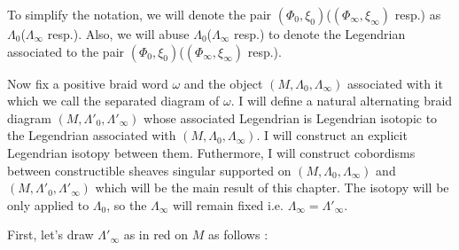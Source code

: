 To simplify the notation, we will denote the pair $(\Phi_0,\xi_0)$($(\Phi_\infty,\xi_\infty)$ resp.) as $\Lambda_0$($\Lambda_\infty$ resp.). Also, we will abuse $\Lambda_0$($\Lambda_\infty$ resp.) to denote the Legendrian associated to the pair $(\Phi_0,\xi_0)$($(\Phi_\infty,\xi_\infty)$ resp.).

Now fix a positive braid word $\omega$ and the object $(M,\Lambda_0,\Lambda_\infty)$ associated with it which we call the separated diagram of $\omega$. I will define a natural alternating braid diagram $(M,\Lambda'_0,\Lambda'_\infty)$ whose associated Legendrian is Legendrian isotopic to the Legendrian associated with $(M,\Lambda_0,\Lambda_\infty)$. I will construct an explicit Legendrian isotopy between them. Futhermore, I will construct cobordisms between constructible sheaves singular supported on $(M,\Lambda_0,\Lambda_\infty)$ and $(M,\Lambda'_0,\Lambda'_\infty)$ which will be the main result of this chapter. The isotopy will be only applied to $\Lambda_0$, so the $\Lambda_\infty$ will remain fixed i.e. $\Lambda_\infty = \Lambda'_\infty$.

First, let's draw $\Lambda'_\infty$ as in red on $M$ as follows :

